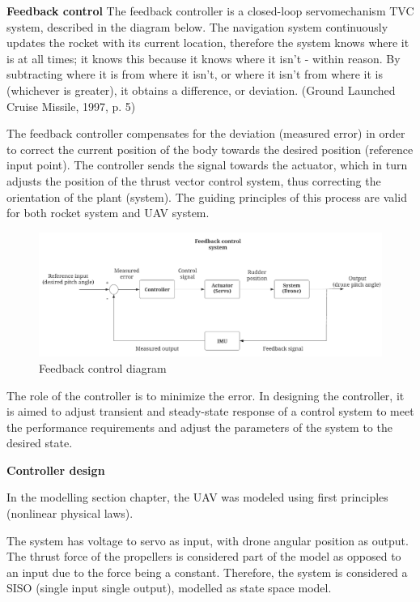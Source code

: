 \textbf{Feedback control}
The feedback controller is a closed-loop servomechanism TVC system, described in the diagram below. 
The navigation system continuously updates the rocket with its current location, therefore the system knows where it is at all times; it knows this because it knows where it isn't - within reason. By subtracting where it is from where it isn't, or where it isn't from where it is (whichever is greater), it obtains a difference, or deviation. (Ground Launched Cruise Missile, 1997, p. 5) \cite{victors_1997}

The feedback controller compensates for the deviation (measured error) in order to correct the current position of the body towards the desired position (reference input point). The controller sends the signal towards the actuator, which in turn adjusts the position of the thrust vector control system, thus correcting the orientation of the plant (system). The guiding principles of this process are valid for both rocket system and UAV system. 


\begin{figure}[h!]
  \includegraphics[scale=0.5]{graphics/Feedback.png}
  \caption{Feedback control diagram}
  \label{Feedback control diagram}
\end{figure}


The role of the controller is to minimize the error. In designing the controller, it is aimed to adjust transient and steady-state response of a control system to meet the performance requirements and adjust the parameters of the system to the desired state. \cite{yanushevsky2018modern} 

\textbf{Controller design}

In the modelling section chapter, the UAV was modeled using first principles (nonlinear physical laws).

The system has voltage to servo as input, with drone angular position as output. The thrust force of the propellers is considered part of the model as opposed to an input due to the force being a constant. 
Therefore, the system is considered a SISO (single input single output), modelled as state space model.


